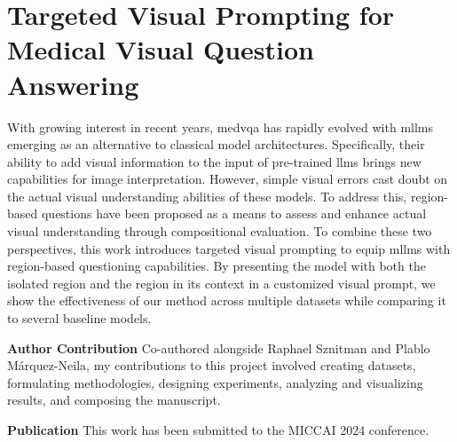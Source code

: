 \chapter{Targeted Visual Prompting for Medical Visual Question Answering}
\label{chapter:locvqallm}



With growing interest in recent years, \gls{medvqa} has rapidly evolved with \glspl{mllm} emerging as an alternative to classical model architectures. Specifically, their ability to add visual information to the input of pre-trained \glspl{llm} brings new capabilities for image interpretation. However, simple visual errors cast doubt on the actual visual understanding abilities of these models. To address this, region-based questions have been proposed as a means to assess and enhance actual visual understanding through compositional evaluation. To combine these two perspectives, this work introduces targeted visual prompting to equip \glspl{mllm} with region-based questioning capabilities. By presenting the model with both the isolated region and the region in its context in a customized visual prompt, we show the effectiveness of our method across multiple datasets while comparing it to several baseline models.

\textbf{Author Contribution} Co-authored alongside Raphael Sznitman and Plablo Márquez-Neila, my contributions to this project involved creating datasets, formulating methodologies, designing experiments, analyzing and visualizing results, and composing the manuscript.

\textbf{Publication} This work has been submitted to the MICCAI 2024 conference.

\newpage




